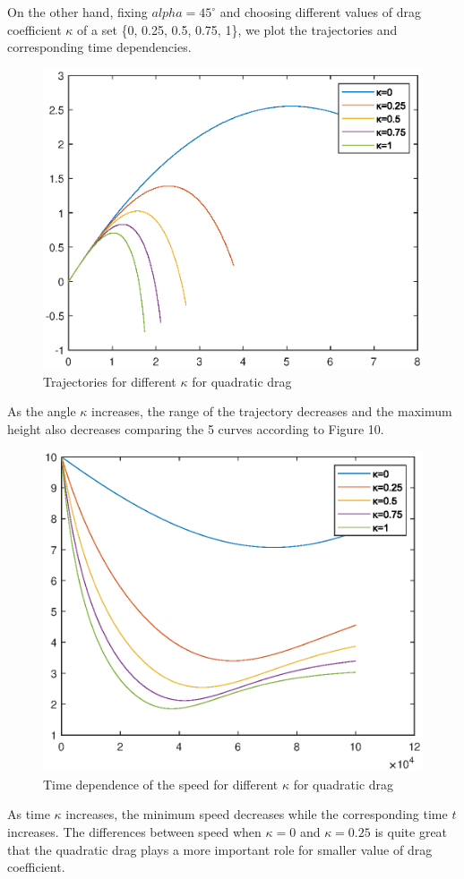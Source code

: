 \documentclass[12pt]{report}
\begin{document}
On the other hand, fixing $alpha=45^\circ$ and choosing different values of drag coefficient $\kappa$ of a set \{0, 0.25, 0.5, 0.75, 1\}, we plot the trajectories and corresponding time dependencies.
\begin{figure}[H]
    \centering
    \includegraphics[width=1\linewidth]{2-2-4.eps}
    \caption{Trajectories for different $\kappa$ for quadratic drag}
\end{figure}
As the angle $\kappa$ increases, the range of the trajectory decreases and the maximum height also decreases comparing the 5 curves according to Figure 10.
\begin{figure}[H]
    \centering
    \includegraphics[width=1\linewidth]{2-2-5.eps}
    \caption{Time dependence of the speed for different $\kappa$ for quadratic drag}
\end{figure}
As  time $\kappa$ increases, the minimum speed decreases while the corresponding time $t$ increases. The differences between speed when $\kappa=0$ and $\kappa=0.25$ is quite great that the quadratic drag plays a more important role for smaller value of drag coefficient.
\end{document}
